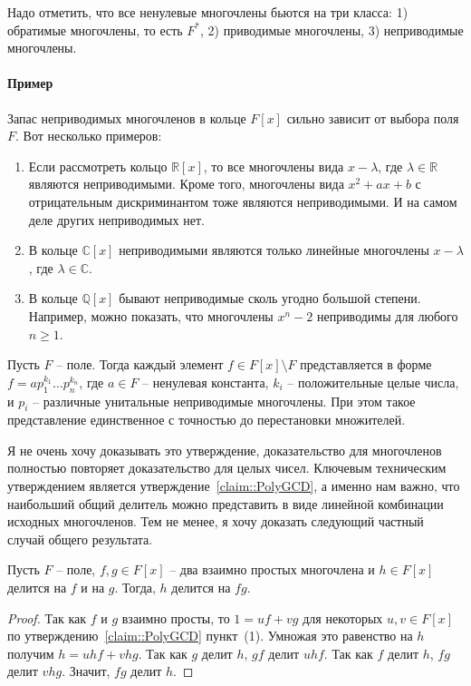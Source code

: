 Надо отметить, что все ненулевые многочлены бьются на три класса: 1) обратимые многочлены, то есть $F^*$, 2) приводимые многочлены, 3) неприводимые многочлены.

\paragraph{Пример}

Запас неприводимых многочленов в кольце $F[x]$ сильно зависит от выбора поля $F$.
Вот несколько примеров:
\begin{enumerate}
\item Если рассмотреть кольцо $\mathbb R[x]$, то все многочлены вида $x - \lambda$, где $\lambda\in \mathbb R$ являются неприводимыми.
Кроме того, многочлены вида $x^2 + ax + b$ с отрицательным дискриминантом тоже являются неприводимыми.
И на самом деле других неприводимых нет.

\item В кольце $\mathbb C[x]$ неприводимыми являются только линейные многочлены $x - \lambda$, где $\lambda \in \mathbb C$.

\item В кольце $\mathbb Q[x]$ бывают неприводимые сколь угодно большой степени.
Например, можно показать, что многочлены $x^n - 2$ неприводимы для любого $n \geqslant 1$.
\end{enumerate}

\begin{claim}
[UFD]
\label{claim::PolyUFD}
Пусть $F$ -- поле.
Тогда каждый элемент $f\in F[x]\setminus F$ представляется в форме $f = a p_1^{k_1}\ldots p_n^{k_n}$, где $a\in F$ -- ненулевая константа, $k_i$ -- положительные целые числа, и $p_i$ -- различные унитальные неприводимые многочлены.
При этом такое представление единственное с точностью до перестановки множителей.
\end{claim}

Я не очень хочу доказывать это утверждение, доказательство для многочленов полностью повторяет доказательство для целых чисел.
Ключевым техническим утверждением является утверждение~\ref{claim::PolyGCD}, а именно нам важно, что наибольший общий делитель можно представить в виде линейной комбинации исходных многочленов.
Тем не менее, я хочу доказать следующий частный случай общего результата.

\begin{claim}
\label{claim::PolyCoprimeDividesPoly}
Пусть $F$ -- поле, $f, g\in F[x]$ -- два взаимно простых многочлена и $h\in F[x]$ делится на $f$ и на $g$.
Тогда, $h$ делится на $fg$.
\end{claim}
\begin{proof}
Так как $f$ и $g$ взаимно просты, то $1 = uf + vg$ для некоторых $u,v\in F[x]$ по утверждению~\ref{claim::PolyGCD} пункт~(1).
Умножая это равенство на $h$ получим $h = u hf + v hg$.
Так как $g$ делит $h$, $gf$ делит $uhf$.
Так как $f$ делит $h$, $fg$ делит $vhg$.
Значит, $fg$ делит $h$.
\end{proof}

